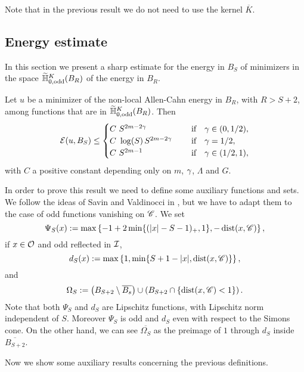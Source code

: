 Note that in the previous result we do not need to use the kernel $\overline{K}$.


\subsection{Energy estimate}

In this section we present a sharp estimate for the energy in $B_S$ of minimizers in the space $\widetilde{\mathbb{H}}^K_{0, \textrm{odd}}(B_R)$ of the energy in $B_R$.

\begin{theorem}
	\label{Th:EnergyEstimate} Let $u$ be a minimizer of the non-local Allen-Cahn energy in $B_{R}$,
	with $R>S+2$, among functions that are in $\widetilde{\mathbb{H}}^K_{0, \textrm{odd}}(B_R)$. Then
	$$ \mathcal{E} (u,B_S) \leq \begin{cases}
	C \ S^{2m-2\gamma}\ \ \ \ &\textrm{if } \ \ \gamma\in(0,1/2),\\
	C\ \log(S)\,S^{2m-2\gamma}\ \ \ \ &\textrm{if } \ \ \gamma=1/2,\\
	C \ S^{2m-1}\ \ \ \ &\textrm{if } \ \ \gamma\in(1/2,1),\\
	\end{cases} $$
	with $C$ a positive constant depending only on $m$, $\gamma$, $\Lambda$ and $G$.
\end{theorem}

In order to prove this result we need to define some auxiliary functions and sets. We follow the ideas of Savin and Valdinocci in \cite{SavinValdinoci-EnergyEstimate}, but we have to adapt them to the case of odd functions vanishing on $\mathscr{C}$. We set
$$ \Psi_S(x) := \max\left\{-1+2\min\{(|x|-S-1)_+,1\},-\operatorname{dist}(x,\mathscr{C}) \right\},  $$
if $x\in \mathcal{O}$ and odd reflected in $\mathcal{I}$,
$$ d_S(x) := \max\left\{1,\min\{S+1-|x|,\operatorname{dist}(x,\mathscr{C})\} \right\},  $$
and
$$ \Omega_S := \left( B_{S+2}\setminus \overline{B_s} \right) \cup \left( B_{S+2} \cap \{\operatorname{dist}(x,\mathscr{C})< 1\}\right). $$
Note that both $\Psi_S$ and $d_S$ are Lipschitz functions, with Lipschitz norm independent of
$S$. Moreover $\Psi_S$ is odd and $d_S$ even with respect to the Simons cone. On the other hand, we
can see $\overline{\Omega_S}$ as the preimage of $1$ through $d_S$ inside $\overline{B_{S+2}}$.

Now we show some auxiliary results concerning the previous definitions.

